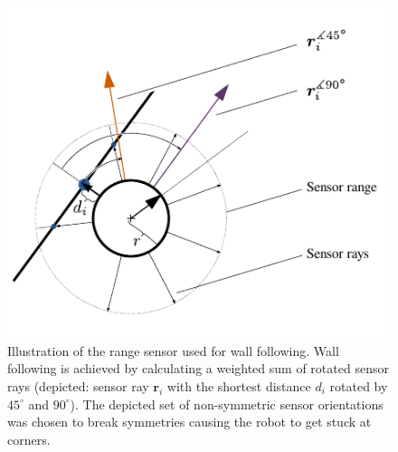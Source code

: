 \documentclass[letterpaper,10pt,conference]{ieeeconf}
\renewcommand{\vec}[1]{\bm{#1}}
\begin{document}
\begin{figure}
       \centering
       \includegraphics{media/robot_wall_following.pdf}
       \caption{Illustration of the range sensor used for wall following. Wall following is achieved by calculating a weighted sum of rotated sensor rays 
		(depicted: sensor ray $\vec r_i$ with the shortest distance $d_i$ rotated by $45^\circ$ and $90^\circ$). The depicted set of non-symmetric sensor orientations 
		was chosen to break symmetries causing the robot to get stuck at corners.}
       \label{fig:robot_wall_following}
\end{figure}
\end{document}
